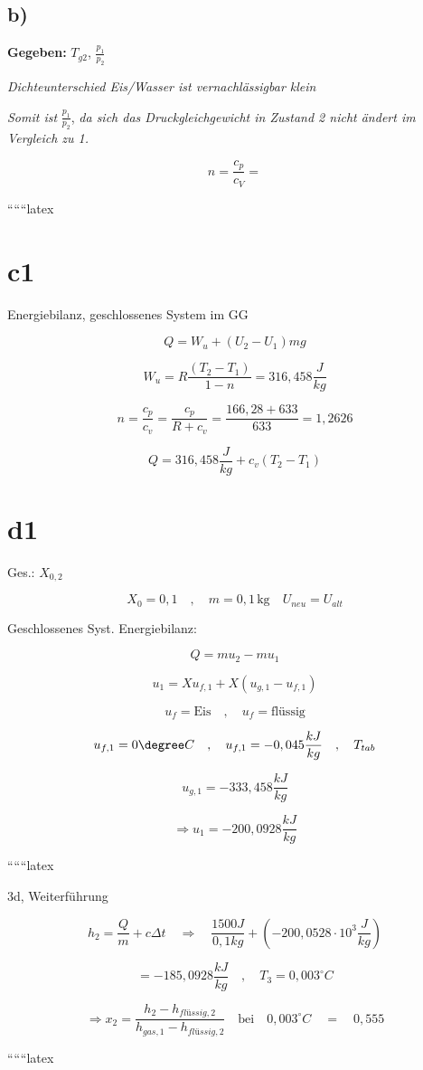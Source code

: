 

\subsection*{b)}
\textbf{Gegeben:} $T_{g2}$, $\frac{p_1}{p_2}$

\textit{Dichteunterschied Eis/Wasser ist vernachlässigbar klein}

\textit{Somit ist} $\frac{p_1}{p_2}$, \textit{da sich das Druckgleichgewicht in Zustand 2 nicht ändert im Vergleich zu 1.}

\[
n = \frac{c_p}{c_V} = 
\]

``````latex


\section*{c1}
Energiebilanz, geschlossenes System im GG

\[
Q = W_u + (U_2 - U_1) mg
\]

\[
W_u = R \frac{(T_2 - T_1)}{1 - n} = 316,458 \frac{J}{kg}
\]

\[
n = \frac{c_p}{c_v} = \frac{c_p}{R + c_v} = \frac{166,28 + 633}{633} = 1,2626
\]

\[
Q = 316,458 \frac{J}{kg} + c_v (T_2 - T_1)
\]

\section*{d1}
Ges.: \(X_{0,2}\)

\[
X_0 = 0,1 \quad , \quad m = 0,1 \, \text{kg} \quad U_{neu} = U_{alt}
\]

Geschlossenes Syst. Energiebilanz:

\[
Q = m u_2 - m u_1
\]

\[
u_1 = X u_{f,1} + X (u_{g,1} - u_{f,1})
\]

\[
u_f = \text{Eis} \quad , \quad u_f = \text{flüssig}
\]

\[
u_{f,1} = 0 \degree C \quad , \quad u_{f,1} = -0,045 \frac{kJ}{kg} \quad , \quad T_{tab}
\]

\[
u_{g,1} = -333,458 \frac{kJ}{kg}
\]

\[
\Rightarrow u_1 = -200,0928 \frac{kJ}{kg}
\]

``````latex

3d, Weiterführung

\[
h_2 = \frac{Q}{m} + c \Delta t \quad \Rightarrow \quad \frac{1500 J}{0,1 kg} + (-200,0528 \cdot 10^3 \frac{J}{kg})
\]

\[
= -185,0928 \frac{kJ}{kg} \quad , \quad T_3 = 0,003^\circ C
\]

\[
\Rightarrow x_2 = \frac{h_2 - h_{flüssig,2}}{h_{gas,1} - h_{flüssig,2}} \quad \text{bei} \quad 0,003^\circ C \quad = \quad 0,555
\]

``````latex